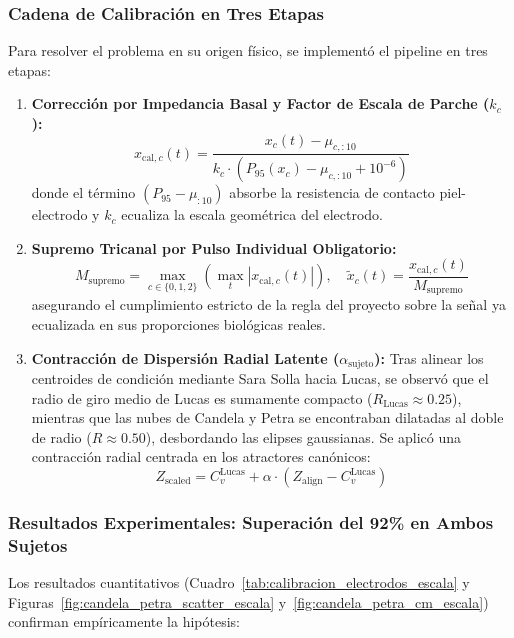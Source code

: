 \documentclass[11pt,a4paper]{article}
\begin{document}
\subsubsection{Cadena de Calibración en Tres Etapas}
Para resolver el problema en su origen físico, se implementó el pipeline en tres etapas:
\begin{enumerate}
    \item \textbf{Corrección por Impedancia Basal y Factor de Escala de Parche ($k_c$):}
    \begin{equation}
    x_{\text{cal}, c}(t) = \frac{x_c(t) - \mu_{c,:10}}{k_c \cdot (P_{95}(x_c) - \mu_{c,:10} + 10^{-6})}
    \end{equation}
    donde el término $(P_{95} - \mu_{:10})$ absorbe la resistencia de contacto piel-electrodo y $k_c$ ecualiza la escala geométrica del electrodo.
    \item \textbf{Supremo Tricanal por Pulso Individual Obligatorio:}
    \begin{equation}
    M_{\text{supremo}} = \max_{c \in \{0, 1, 2\}} \left( \max_t |x_{\text{cal}, c}(t)| \right), \quad \tilde{x}_c(t) = \frac{x_{\text{cal}, c}(t)}{M_{\text{supremo}}}
    \end{equation}
    asegurando el cumplimiento estricto de la regla del proyecto sobre la señal ya ecualizada en sus proporciones biológicas reales.
    \item \textbf{Contracción de Dispersión Radial Latente ($\alpha_{\text{sujeto}}$):}
    Tras alinear los centroides de condición mediante Sara Solla hacia Lucas, se observó que el radio de giro medio de Lucas es sumamente compacto ($R_{\text{Lucas}} \approx 0.25$), mientras que las nubes de Candela y Petra se encontraban dilatadas al doble de radio ($R \approx 0.50$), desbordando las elipses gaussianas. Se aplicó una contracción radial centrada en los atractores canónicos:
    \begin{equation}
    Z_{\text{scaled}} = C_v^{\text{Lucas}} + \alpha \cdot (Z_{\text{align}} - C_v^{\text{Lucas}})
    \end{equation}
\end{enumerate}

\subsubsection{Resultados Experimentales: Superación del 92\% en Ambos Sujetos}
Los resultados cuantitativos (Cuadro~\ref{tab:calibracion_electrodos_escala} y Figuras~\ref{fig:candela_petra_scatter_escala} y~\ref{fig:candela_petra_cm_escala}) confirman empíricamente la hipótesis:
\end{document}
